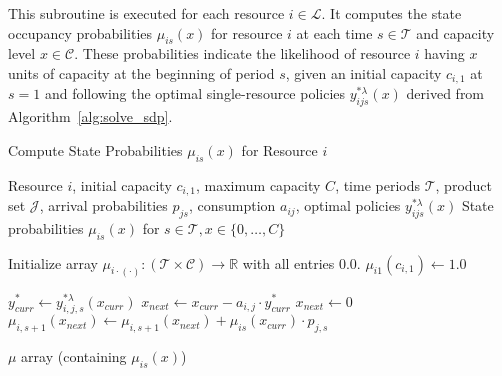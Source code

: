 \documentclass[11pt]{article}
\newcommand{\R}{\mathbb{R}}
\begin{document}
\noindent
This subroutine is executed for each resource $i \in \mathcal{L}$. 
It computes the state occupancy probabilities $\mu_{is}(x)$ for resource $i$ at each time $s \in \mathcal{T}$ and capacity level $x \in \mathcal{C}$. 
These probabilities indicate the likelihood of resource $i$ having $x$ units of capacity at the beginning of period $s$, given an initial capacity $c_{i,1}$ at $s=1$ and following the optimal single-resource policies $y^{*\lambda}_{ijs}(x)$ derived from Algorithm~\ref{alg:solve_sdp}.

\begin{algorithm}[H]
\caption{Compute State Probabilities $\mu_{is}(x)$ for Resource $i$}
\label{alg:compute_mu}
\begin{algorithmic}[1]
\Require Resource $i$, initial capacity $c_{i,1}$, maximum capacity $C$, time periods $\mathcal{T}$, product set $\mathcal{J}$, arrival probabilities $p_{js}$, consumption $a_{ij}$, optimal policies $y^{*\lambda}_{ijs}(x)$
\Ensure State probabilities $\mu_{is}(x)$ for $s \in \mathcal{T}, x \in \{0, \ldots, C\}$

\State Initialize array $\mu_{i \cdot (\cdot)} : (\mathcal{T} \times \mathcal{C}) \to \R$ with all entries $0.0$.
\State $\mu_{i1}(c_{i,1}) \gets 1.0$ 

 
     
         
             
                \State $y^*_{curr} \gets y^{*\lambda}_{i,j,s}(x_{curr})$ 
                \State $x_{next} \gets x_{curr} - a_{i,j} \cdot y^*_{curr}$
                 
                    \State $x_{next} \gets 0$ 
                \EndIf
                \State $\mu_{i,s+1}(x_{next}) \gets \mu_{i,s+1}(x_{next}) + \mu_{is}(x_{curr}) \cdot p_{j,s}$
            \EndFor
        \EndIf
    \EndFor
\EndFor

\State \Return $\mu$ array (containing $\mu_{is}(x)$)
\end{algorithmic}
\end{algorithm}

\vspace{0.5cm}



\newpage
\end{document}
